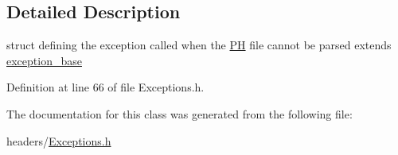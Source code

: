 \subsection{Detailed Description}
struct defining the exception called when the \hyperlink{classPH}{P\+H} file cannot be parsed extends \hyperlink{structexception__base}{exception\+\_\+base} 

Definition at line 66 of file Exceptions.\+h.



The documentation for this class was generated from the following file\+:\begin{DoxyCompactItemize}
\item 
headers/\hyperlink{Exceptions_8h}{Exceptions.\+h}\end{DoxyCompactItemize}
